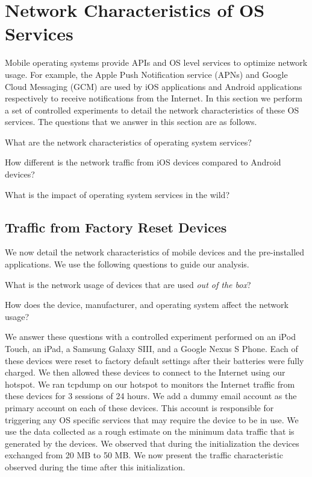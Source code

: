 \section{Network Characteristics of OS Services}
\label{sec:characterize-os}

Mobile operating systems provide APIs and OS level services to optimize network usage.
For example, the Apple Push Notification service (APNs) and Google Cloud Messaging (GCM) are used by iOS applications and Android applications respectively to receive notifications from the Internet.
In this section we perform a set of controlled experiments to detail the network characteristics of these OS services.
The questions that we answer in this section are as follows.
\begin{packedenumerate}
\item What are the network characteristics of operating system services?
\item How different is the network traffic from iOS devices compared to Android devices?
\item What is the impact of operating system services in the wild? 
\end{packedenumerate}

\subsection{Traffic from Factory Reset Devices}

We now detail the network characteristics of mobile devices and the pre-installed applications.
We use the following questions to guide our analysis.
\begin{packedenumerate}
\item What is the network usage of devices that are used \emph{out of the box}? 
\item How does the device, manufacturer, and operating system affect the network usage?
\end{packedenumerate}

We answer these questions with a controlled experiment performed on an iPod Touch, an iPad, a Samsung Galaxy SIII, and a Google Nexus S Phone.
Each of these devices were reset to factory default settings after their batteries were fully charged. 
We then allowed these devices to connect to the Internet using our \wifi hotspot.
We ran tcpdump on our hotspot to monitors the Internet traffic from these devices for 3 sessions of 24 hours. 
We add a dummy email account as the primary account on each of these devices. 
This account is responsible for triggering any OS specific services that may require the device to be in use. 
We use the data collected as a rough estimate on the minimum data traffic that is generated by the devices. 
We observed that during the initialization the devices exchanged from 20 MB to 50 MB. 
We now present the traffic characteristic observed during the time after this initialization. 

